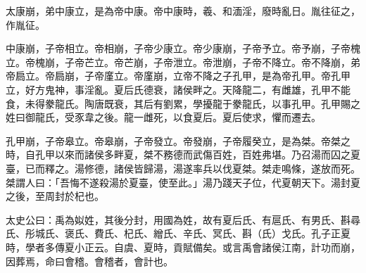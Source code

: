 \begin{pinyinscope}
太康崩，弟中康立，是為帝中康。帝中康時，羲、和湎淫，廢時亂日。胤往征之，作胤征。

中康崩，子帝相立。帝相崩，子帝少康立。帝少康崩，子帝予立。帝予崩，子帝槐立。帝槐崩，子帝芒立。帝芒崩，子帝泄立。帝泄崩，子帝不降立。帝不降崩，弟帝扃立。帝扃崩，子帝廑立。帝廑崩，立帝不降之子孔甲，是為帝孔甲。帝孔甲立，好方鬼神，事淫亂。夏后氏德衰，諸侯畔之。天降龍二，有雌雄，孔甲不能食，未得豢龍氏。陶唐既衰，其后有劉累，學擾龍于豢龍氏，以事孔甲。孔甲賜之姓曰御龍氏，受豕韋之後。龍一雌死，以食夏后。夏后使求，懼而遷去。

孔甲崩，子帝皋立。帝皋崩，子帝發立。帝發崩，子帝履癸立，是為桀。帝桀之時，自孔甲以來而諸侯多畔夏，桀不務德而武傷百姓，百姓弗堪。乃召湯而囚之夏臺，已而釋之。湯修德，諸侯皆歸湯，湯遂率兵以伐夏桀。桀走鳴條，遂放而死。桀謂人曰：「吾悔不遂殺湯於夏臺，使至此。」湯乃踐天子位，代夏朝天下。湯封夏之後，至周封於杞也。

太史公曰：禹為姒姓，其後分封，用國為姓，故有夏后氏、有扈氏、有男氏、斟尋氏、彤城氏、褒氏、費氏、杞氏、繒氏、辛氏、冥氏、斟（氏）戈氏。孔子正夏時，學者多傳夏小正云。自虞、夏時，貢賦備矣。或言禹會諸侯江南，計功而崩，因葬焉，命曰會稽。會稽者，會計也。


\end{pinyinscope}